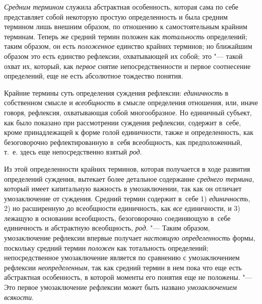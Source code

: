 {\em Средним термином}
служила абстрактная особенность, которая сама по себе
представляет собой некоторую простую определенность и была средним термином
лишь внешним образом, по отношению к самостоятельным крайним терминам.
Теперь же средний термин положен как
{\em тотальность}
определений; таким образом, он есть
{\em положенное} единство
крайних терминов; но ближайшим образом это есть единство рефлексии,
охватывающей их собой; это "--- такой охват их, который, как
{\em первое} снятие
непосредственности и первое соотнесение определений, еще не есть абсолютное
тождество понятия.

Крайние термины суть определения суждения рефлексии:
{\em единичность} в
собственном смысле и {\em всеобщность}
в смысле определения отношения, или, иначе говоря, рефлексия,
охватывающая собой многообразное. Но единичный субъект, как было показано
при рассмотрении суждения рефлексии, содержит в~себе, кроме принадлежащей к
форме голой единичности, также и определенность, как безоговорочно
рефлектированную в~себя всеобщность, как предположенный, т.~е. здесь еще
непосредственно взятый {\em род}.

Из этой определенности крайних терминов, которая получается в
ходе развития определений суждения, вытекает более детальное содержание
{\em среднего термина},
который имеет капитальную важность в умозаключении, так как
он отличает умозаключение от суждения. Средний термин содержит в~себе 1)
{\em единичность}, 2) но
расширенную до всеобщности единичность, как
{\em все} единичности, и
3) лежащую в основании всеобщность, безоговорочно соединяющую в~себе
единичность и абстрактную всеобщность,
{\em род}. "--- Таким
образом, умозаключение рефлексии впервые получает
{\em настоящую определенность}
формы, поскольку средний термин
{\em положен} как
тотальность определений; непосредственное умозаключение является
по сравнению с умозаключением рефлексии
{\em неопределенным}, так
как средний термин в нем пока что еще есть абстрактная особенность, в
которой моменты его понятия еще не положены. "--- Это первое
умозаключение рефлексии может быть названо
{\em умозаключением
всякости}.

